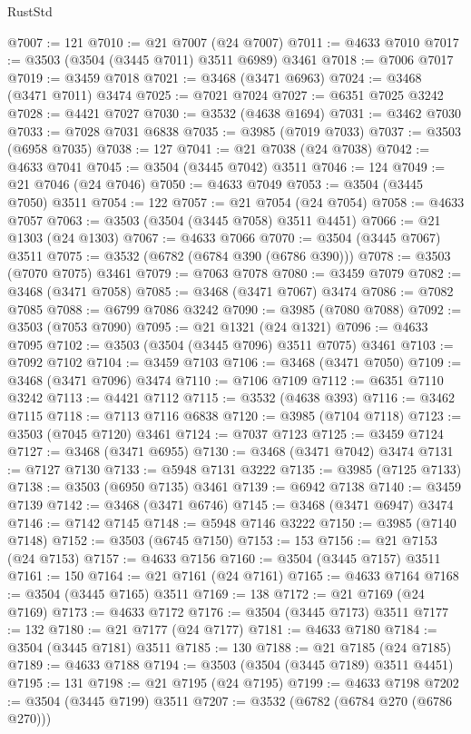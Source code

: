 \begin{lexlean}{RustStd}
\begin{coremodule}
@7007 := 121
@7010 := @21 @7007 (@24 @7007)
@7011 := @4633 @7010
@7017 := @3503 (@3504 (@3445 @7011) @3511 @6989) @3461
@7018 := @7006 @7017
@7019 := @3459 @7018
@7021 := @3468 (@3471 @6963)
@7024 := @3468 (@3471 @7011) @3474
@7025 := @7021 @7024
@7027 := @6351 @7025 @3242
@7028 := @4421 @7027
@7030 := @3532 (@4638 @1694)
@7031 := @3462 @7030
@7033 := @7028 @7031 @6838
@7035 := @3985 (@7019 @7033)
@7037 := @3503 (@6958 @7035)
@7038 := 127
@7041 := @21 @7038 (@24 @7038)
@7042 := @4633 @7041
@7045 := @3504 (@3445 @7042) @3511
@7046 := 124
@7049 := @21 @7046 (@24 @7046)
@7050 := @4633 @7049
@7053 := @3504 (@3445 @7050) @3511
@7054 := 122
@7057 := @21 @7054 (@24 @7054)
@7058 := @4633 @7057
@7063 := @3503 (@3504 (@3445 @7058) @3511 @4451)
@7066 := @21 @1303 (@24 @1303)
@7067 := @4633 @7066
@7070 := @3504 (@3445 @7067) @3511
@7075 := @3532 (@6782 (@6784 @390 (@6786 @390)))
@7078 := @3503 (@7070 @7075) @3461
@7079 := @7063 @7078
@7080 := @3459 @7079
@7082 := @3468 (@3471 @7058)
@7085 := @3468 (@3471 @7067) @3474
@7086 := @7082 @7085
@7088 := @6799 @7086 @3242
@7090 := @3985 (@7080 @7088)
@7092 := @3503 (@7053 @7090)
@7095 := @21 @1321 (@24 @1321)
@7096 := @4633 @7095
@7102 := @3503 (@3504 (@3445 @7096) @3511 @7075) @3461
@7103 := @7092 @7102
@7104 := @3459 @7103
@7106 := @3468 (@3471 @7050)
@7109 := @3468 (@3471 @7096) @3474
@7110 := @7106 @7109
@7112 := @6351 @7110 @3242
@7113 := @4421 @7112
@7115 := @3532 (@4638 @393)
@7116 := @3462 @7115
@7118 := @7113 @7116 @6838
@7120 := @3985 (@7104 @7118)
@7123 := @3503 (@7045 @7120) @3461
@7124 := @7037 @7123
@7125 := @3459 @7124
@7127 := @3468 (@3471 @6955)
@7130 := @3468 (@3471 @7042) @3474
@7131 := @7127 @7130
@7133 := @5948 @7131 @3222
@7135 := @3985 (@7125 @7133)
@7138 := @3503 (@6950 @7135) @3461
@7139 := @6942 @7138
@7140 := @3459 @7139
@7142 := @3468 (@3471 @6746)
@7145 := @3468 (@3471 @6947) @3474
@7146 := @7142 @7145
@7148 := @5948 @7146 @3222
@7150 := @3985 (@7140 @7148)
@7152 := @3503 (@6745 @7150)
@7153 := 153
@7156 := @21 @7153 (@24 @7153)
@7157 := @4633 @7156
@7160 := @3504 (@3445 @7157) @3511
@7161 := 150
@7164 := @21 @7161 (@24 @7161)
@7165 := @4633 @7164
@7168 := @3504 (@3445 @7165) @3511
@7169 := 138
@7172 := @21 @7169 (@24 @7169)
@7173 := @4633 @7172
@7176 := @3504 (@3445 @7173) @3511
@7177 := 132
@7180 := @21 @7177 (@24 @7177)
@7181 := @4633 @7180
@7184 := @3504 (@3445 @7181) @3511
@7185 := 130
@7188 := @21 @7185 (@24 @7185)
@7189 := @4633 @7188
@7194 := @3503 (@3504 (@3445 @7189) @3511 @4451)
@7195 := 131
@7198 := @21 @7195 (@24 @7195)
@7199 := @4633 @7198
@7202 := @3504 (@3445 @7199) @3511
@7207 := @3532 (@6782 (@6784 @270 (@6786 @270)))

\end{coremodule}
\end{lexlean}
